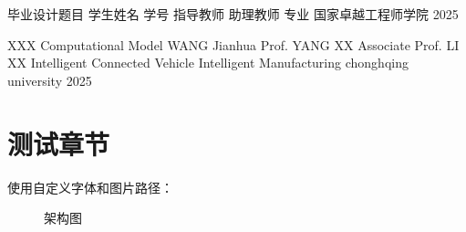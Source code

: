 \documentclass{document}
\begin{document}
\makecovercn
  {毕业设计题目}
  {学生姓名}
  {学号}
  {指导教师}
  {助理教师}
  {专业}
  {国家卓越工程师学院}
  {2025}

\makecoveren
  {XXX Computational Model}
  {WANG Jianhua}
  {Prof. YANG XX}
  {Associate Prof. LI XX} 
  {Intelligent Connected Vehicle}
  {Intelligent Manufacturing}
  {chonghqing university}
  {2025} 

  


  \section{测试章节}
使用自定义字体和图片路径：
\begin{figure}[htbp]
  \centering
  \caption{架构图}
\end{figure}

\end{document}
